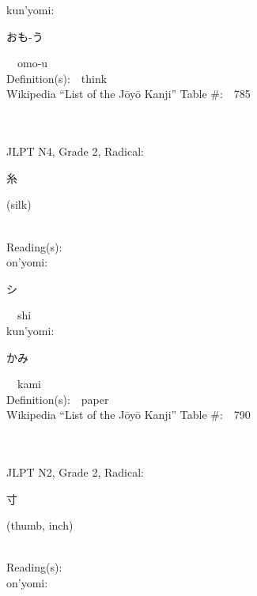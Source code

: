 \begin{multicols}{2}
{\hspace*{1em}}kun'yomi:\ \ \\
{\hspace*{2em}}{\begin{CJK}{UTF8}{min} おも-う \end{CJK}}\ \ omo-u\ \ \\
Definition(s):\ \ think \\
Wikipedia ``List of the J\=oy\=o Kanji'' Table \#:\ \ 785 \\
\ \ \\
{\fontsize{34pt}{40pt}  }\ \ \\  %
{JLPT N4, Grade 2, Radical:\ \ {\begin{CJK}{UTF8}{min} 糸 \end{CJK}} (silk) } \\
Reading(s):\ \ \\
{\hspace*{1em}}on'yomi:\ \ \\
{\hspace*{2em}}{\begin{CJK}{UTF8}{min} シ \end{CJK}}\ \ shi\ \ \\
{\hspace*{1em}}kun'yomi:\ \ \\
{\hspace*{2em}}{\begin{CJK}{UTF8}{min} かみ \end{CJK}}\ \ kami\ \ \\
Definition(s):\ \ paper \\
Wikipedia ``List of the J\=oy\=o Kanji'' Table \#:\ \ 790 \\
\ \ \\
{\fontsize{34pt}{40pt}  }\ \ \\  %
{JLPT N2, Grade 2, Radical:\ \ {\begin{CJK}{UTF8}{min} 寸 \end{CJK}} (thumb, inch) } \\
Reading(s):\ \ \\
{\hspace*{1em}}on'yomi:\ \ \\

\end{multicols}
